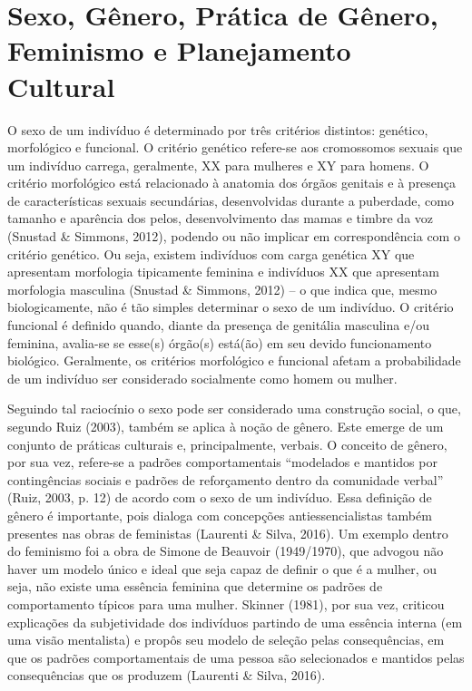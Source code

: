 \section{Sexo, Gênero, Prática de Gênero, Feminismo e Planejamento Cultural}

O sexo de um indivíduo é determinado por três critérios distintos: genético, morfológico e funcional. O critério genético refere-se aos cromossomos sexuais que um indivíduo carrega, geralmente, XX para mulheres e XY para homens. O critério morfológico está relacionado à anatomia dos órgãos genitais e à presença de características sexuais secundárias, desenvolvidas durante a puberdade, como tamanho e aparência dos pelos, desenvolvimento das mamas e timbre da voz (Snustad \& Simmons, 2012), podendo ou não implicar em correspondência com o critério genético. Ou seja, existem indivíduos com carga genética XY que apresentam morfologia tipicamente feminina e indivíduos XX que apresentam morfologia masculina (Snustad \& Simmons, 2012) – o que indica que, mesmo biologicamente, não é tão simples determinar o sexo de um indivíduo. O critério funcional é definido quando, diante da presença de genitália masculina e/ou feminina, avalia-se se esse(s) órgão(s) está(ão) em seu devido funcionamento biológico. Geralmente, os critérios morfológico e funcional afetam a probabilidade de um indivíduo ser considerado socialmente como homem ou mulher.

Seguindo tal raciocínio o sexo pode ser considerado uma construção social, o que, segundo Ruiz (2003), também se aplica à noção de gênero. Este emerge de um conjunto de práticas culturais e, principalmente, verbais. O conceito de gênero, por sua vez, refere-se a padrões comportamentais “modelados e mantidos por contingências sociais e padrões de reforçamento dentro da comunidade verbal” (Ruiz, 2003, p. 12) de acordo com o sexo de um indivíduo. Essa definição de gênero é importante, pois dialoga com concepções antiessencialistas também presentes nas obras de feministas (Laurenti \& Silva, 2016). Um exemplo dentro do feminismo foi a obra de Simone de Beauvoir (1949/1970), que advogou não haver um modelo único e ideal que seja capaz de definir o que é a mulher, ou seja, não existe uma essência feminina que determine os padrões de comportamento típicos para uma mulher. Skinner (1981), por sua vez, criticou explicações da subjetividade dos indivíduos partindo de uma essência interna (em uma visão mentalista) e propôs seu modelo de seleção pelas consequências, em que os padrões comportamentais de uma pessoa são selecionados e mantidos pelas consequências que os produzem (Laurenti \& Silva, 2016).

